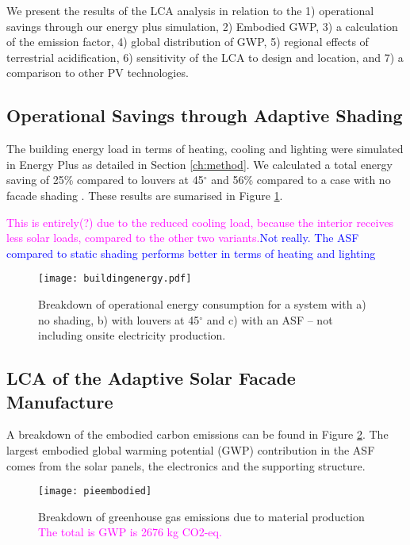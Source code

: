 
We present the results of the LCA analysis in relation to the 1) operational savings through our energy plus simulation, 2) Embodied GWP, 3) a calculation of the emission factor, 4) global distribution of GWP, 5) regional effects of terrestrial acidification, 6) sensitivity of the LCA to design and location, and 7) a comparison to other PV technologies.

\subsection{Operational Savings through Adaptive Shading}
\label{ch:oppResults}

The building energy load in terms of heating, cooling and lighting were simulated in Energy Plus as detailed in Section \ref{ch:method}. We calculated a total energy saving of 25\% compared to louvers at 45$^\circ$ and 56\% compared to a case with no facade shading \cite{jayathissa2015abs}. These results are sumarised in Figure \ref{fig:operational}. 


\textcolor{magenta}{This is entirely(?) due to the reduced cooling load, because the interior receives less solar loads, compared to the other two variants.}\textcolor{blue}{Not really. The ASF compared to static shading performs better in terms of heating and lighting}



\begin{figure}[H]
\begin{center}
\texttt{[image: buildingenergy.pdf]}
\caption{Breakdown of operational energy consumption for a system with a) no shading, b) with louvers at 45$^\circ$ and c) with an ASF -- not including onsite electricity production.}
\label{fig:operational}
\end{center}
\end{figure}

\subsection{LCA of the Adaptive Solar Facade Manufacture}

A breakdown of the embodied carbon emissions can be found in Figure  \ref{fig:embodied}. The largest embodied global warming potential (GWP) contribution in the ASF comes from the solar panels, the electronics and the supporting structure.

\begin{figure}[H]
\begin{center}
\texttt{[image: pieembodied]}
\caption{Breakdown of greenhouse gas emissions due to material production \textcolor{magenta}{The total is GWP is 2676 kg CO2-eq.}}
\label{fig:embodied}
\end{center}
\end{figure}

